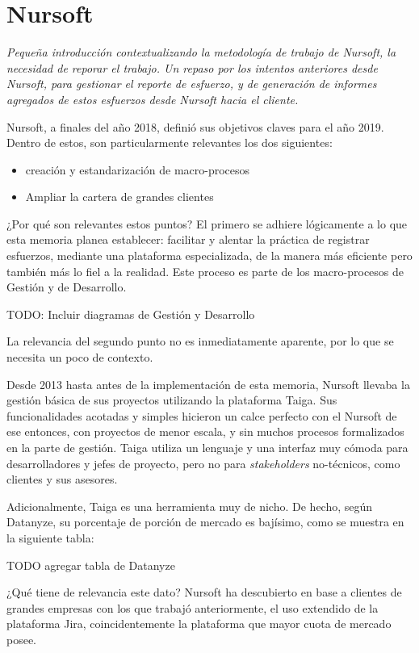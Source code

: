\section{Nursoft}

\textit{Pequeña introducción contextualizando la metodología de trabajo de Nursoft, la necesidad de reporar el trabajo. 
Un repaso por los intentos anteriores desde Nursoft, para gestionar el reporte de esfuerzo,
y de generación de informes agregados de estos esfuerzos desde Nursoft hacia el cliente.}

Nursoft, a finales del año 2018, definió sus objetivos claves para el año 2019. Dentro de estos,
son particularmente relevantes los dos siguientes:

\begin{itemize}
  \item creación y estandarización de macro-procesos
  \item Ampliar la cartera de grandes clientes 
\end{itemize}


¿Por qué son relevantes estos puntos? El primero se adhiere lógicamente a lo que esta memoria planea
establecer: facilitar y alentar la práctica de registrar esfuerzos, mediante una plataforma especializada,
de la manera más eficiente pero también más lo fiel a la realidad. 
Este proceso es parte de los macro-procesos de Gestión y de Desarrollo. 

TODO: Incluir diagramas de Gestión y Desarrollo

La relevancia del segundo punto no es inmediatamente aparente, por lo que se necesita un poco de contexto.

Desde 2013 hasta antes de la implementación de esta memoria, Nursoft llevaba la gestión básica de sus
proyectos utilizando la plataforma Taiga.
Sus funcionalidades acotadas y simples hicieron un calce perfecto con el Nursoft de ese entonces,
con proyectos de menor escala, y sin muchos procesos formalizados en la parte de gestión. 
Taiga utiliza un lenguaje y una interfaz muy cómoda para desarrolladores y jefes de proyecto,
pero no para \textit{stakeholders} no-técnicos, como clientes y sus asesores.

Adicionalmente, Taiga es una herramienta muy de nicho. De hecho, según Datanyze, su porcentaje de 
porción de mercado es bajísimo, como se muestra en la siguiente tabla:

TODO agregar tabla de Datanyze

¿Qué tiene de relevancia este dato? Nursoft ha descubierto en base a clientes de grandes empresas
con los que trabajó anteriormente, el uso extendido de la plataforma Jira, coincidentemente la plataforma
que mayor cuota de mercado posee.

